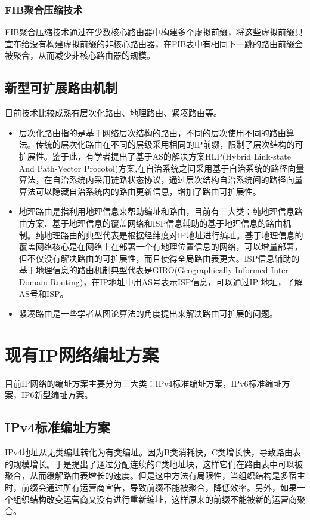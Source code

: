 \subsubsection{FIB聚合压缩技术}
FIB聚合压缩技术通过在少数核心路由器中构建多个虚拟前缀，将这些虚拟前缀只宣布给没有构建虚拟前缀的非核心路由器，在FIB表中有相同下一跳的路由前缀会被聚合，从而减少非核心路由器的规模。
\subsection{新型可扩展路由机制}
目前技术比较成熟有层次化路由、地理路由、紧凑路由等。
\begin{itemize}
\item 层次化路由指的是基于网络层次结构的路由，不同的层次使用不同的路由算法。传统的层次化路由在不同的层级采用相同的IP前缀，限制了层次结构的可扩展性。鉴于此，有学者提出了基于AS的解决方案HLP(Hybrid Link-state And Path-Vector Procotol)方案\cite{HLP},在自治系统之间采用基于自治系统的路径向量算法，在自治系统内采用链路状态协议，通过层次结构自治系统间的路径向量算法可以隐藏自治系统内的路由更新信息，增加了路由可扩展性。
\item 地理路由是指利用地理信息来帮助编址和路由，目前有三大类：纯地理信息路由方案、基于地理信息的覆盖网络和ISP信息辅助的基于地理信息的路由机制。纯地理路由的典型代表是根据经纬度对IP地址进行编址。基于地理信息的覆盖网络核心是在网络上在部署一个有地理位置信息的网络，可以增量部署，但不仅没有解决路由的可扩展性，而且使得全局路由表更大。ISP信息辅助的基于地理信息的路由机制典型代表是GIRO\cite{giro}(Geographically Informed Inter-Domain Routing)，在IP地址中用AS号表示ISP信息，可以通过IP 地址，了解AS号和ISP。
\item 紧凑路由\cite{CompactRouting}是一些学者从图论算法的角度提出来解决路由可扩展的问题。
\end{itemize}

\section{现有IP网络编址方案}
目前IP网络的编址方案主要分为三大类：IPv4标准编址方案，IPv6标准编址方案，IP6新型编址方案。

\subsection{IPv4标准编址方案}
IPv4地址从无类编址转化为有类编址。因为B类消耗快，C类增长快，导致路由表的规模增长。于是提出了通过分配连续的C类地址块，这样它们在路由表中可以被聚合，从而缓解路由表增长的速度。但是这中方法有局限性，当组织结构是多宿主时，前缀会通过所有运营商宣告，导致前缀不能被聚合，降低效率。另外，如果一个组织结构改变运营商又没有进行重新编址，这样原来的前缀不能被新的运营商聚合。

